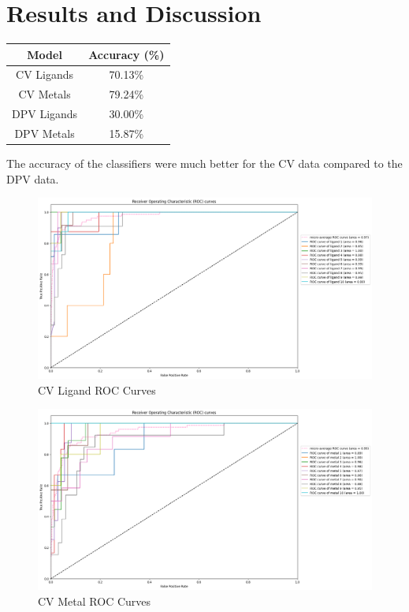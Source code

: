 \section{Results and Discussion}
\begin{center}
\begin{tabular}{c|c}
Model & Accuracy (\%) \\
\hline
CV Ligands & 70.13\% \\
CV Metals & 79.24\% \\
DPV Ligands & 30.00\% \\
DPV Metals & 15.87\%
\end{tabular}
\end{center}
The accuracy of the classifiers were much better for the CV data compared to the DPV data.
\begin{figure}[h!]
  \centering
    \includegraphics[width=1.0\textwidth]{figures/ligand_roc.png}
    \caption{CV Ligand ROC Curves}
    \label{ligand_roc}
\end{figure}
\begin{figure}[h!]
  \centering
    \includegraphics[width=1.0\textwidth]{figures/metal_roc.png}
    \caption{CV Metal ROC Curves}
    \label{metal_roc}
\end{figure}
